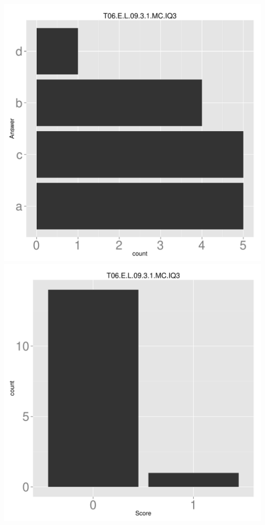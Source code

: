 \documentclass[12pt,english,nohyper]{tufte-handout}\usepackage[]{graphicx}\usepackage[]{color}
\begin{document}
\begin{center} \includegraphics[width=.45\linewidth]{Topic06_AB_44_answer} \includegraphics[width=.45\linewidth]{Topic06_AB_44_score} \end{center} 
\end{document}
